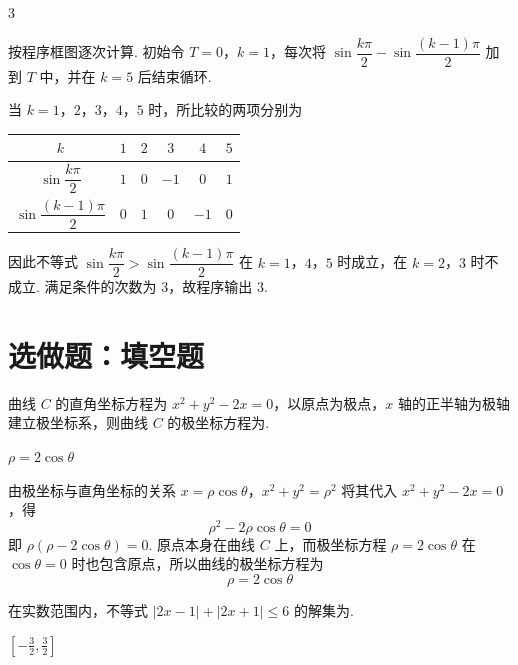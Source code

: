 \begin{answer}
3
\end{answer}

\begin{solution}
按程序框图逐次计算. 初始令 \(T=0\)，\(k=1\)，每次将
\(\sin\dfrac{k\pi}{2}-\sin\dfrac{(k-1)\pi}{2}\) 加到 \(T\) 中，并在 \(k=5\) 后结束循环.

当 \(k=1\)，\(2\)，\(3\)，\(4\)，\(5\) 时，所比较的两项分别为
\begin{center}
\begin{tabular}{c|ccccc}
\(k\) & \(1\) & \(2\) & \(3\) & \(4\) & \(5\) \\
\hline
\(\sin\dfrac{k\pi}{2}\) & \(1\) & \(0\) & \(-1\) & \(0\) & \(1\) \\
\(\sin\dfrac{(k-1)\pi}{2}\) & \(0\) & \(1\) & \(0\) & \(-1\) & \(0\)
\end{tabular}
\end{center}
因此不等式
\(\sin\dfrac{k\pi}{2}>\sin\dfrac{(k-1)\pi}{2}\)
在 \(k=1\)，\(4\)，\(5\) 时成立，在 \(k=2\)，\(3\) 时不成立. 满足条件的次数为 \(3\)，故程序输出 \(3\).
\end{solution}

\section{选做题：填空题}

\begin{problem}
曲线 \(C\) 的直角坐标方程为 \(x^{2} + y^{2} - 2x = 0\)，以原点为极点，\(x\) 轴的正半轴为极轴建立极坐标系，则曲线 \(C\) 的极坐标方程为\fillinblank{}.
\end{problem}

\begin{answer}
\(\rho = 2\cos\theta\)
\end{answer}

\begin{solution}
由极坐标与直角坐标的关系
\(x=\rho\cos\theta\)，\(x^2+y^2=\rho^2\)
将其代入 \(x^2+y^2-2x=0\)，得
\[
\rho^2-2\rho\cos\theta=0
\]
即 \(\rho(\rho-2\cos\theta)=0\). 原点本身在曲线 \(C\) 上，而极坐标方程 \(\rho=2\cos\theta\) 在 \(\cos\theta=0\) 时也包含原点，所以曲线的极坐标方程为
\[
\rho=2\cos\theta
\]
\end{solution}

\begin{problem}
在实数范围内，不等式 \(|2x - 1| + |2x + 1| \leqslant 6\) 的解集为\fillinblank{}.
\end{problem}

\begin{answer}
\(\left[-\frac{3}{2}, \frac{3}{2}\right]\)
\end{answer}

